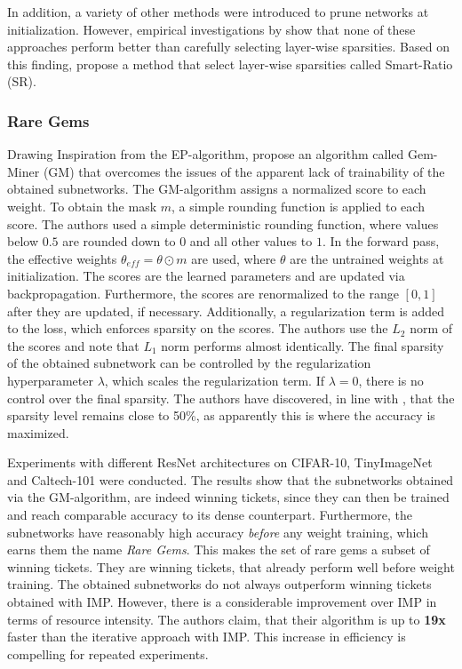 In addition, a variety of other methods \autocite{GraSP,SNIP,SynFlow} were introduced to prune networks at initialization. However, empirical investigations by \textcite{PruningAtInitMissingTheMark, SanityCheckingPruningMethods} show that none of these approaches perform better than carefully selecting layer-wise sparsities.
Based on this finding, \autocite{SanityCheckingPruningMethods} propose a method that select layer-wise sparsities called Smart-Ratio (SR).

\subsubsection{Rare Gems}
Drawing Inspiration from the EP-algorithm, \textcite{RareGems} propose an algorithm called Gem-Miner (GM) that overcomes the issues of the apparent lack of trainability of the obtained subnetworks.
The GM-algorithm assigns a normalized score to each weight. 
To obtain the mask $m$, a simple rounding function is applied to each score. The authors used a simple deterministic rounding function, where values below $0.5$ are rounded down to $0$ and all other values to $1$.
In the forward pass, the effective weights $\theta_{eff} = \theta \odot m$ are used, where $\theta$ are the untrained weights at initialization. 
The scores are the learned parameters and are updated via backpropagation.
Furthermore, the scores are renormalized to the range $[0,1]$ after they are updated, if necessary.
Additionally, a regularization term is added to the loss, which enforces sparsity on the scores. 
The authors use the $L_2$ norm of the scores and note that $L_1$ norm performs almost identically.
The final sparsity of the obtained subnetwork can be controlled by the regularization hyperparameter $\lambda$, which scales the regularization term.
 If $\lambda = 0$, there is no control over the final sparsity. 
 The authors have discovered, in line with \cite{DBLP:conf/cvpr/RamanujanWKFR20}, that the sparsity level remains close to 50\%, as apparently this is where the accuracy is maximized.

Experiments with different ResNet architectures on CIFAR-10, TinyImageNet \autocite{Tinyimagenet} and Caltech-101 \autocite{Caltech101} were conducted. 
The results show that the subnetworks obtained via the GM-algorithm, are indeed winning tickets, since they can then be trained and reach comparable accuracy to its dense counterpart.
Furthermore, the subnetworks have reasonably high accuracy \textit{before} any weight training, which earns them the name \textit{Rare Gems}. 
This makes the set of rare gems a subset of winning tickets. 
They are winning tickets, that already perform well before weight training.
The obtained subnetworks do not always outperform winning tickets obtained with IMP.
However, there is a considerable improvement over IMP in terms of resource intensity.
The authors claim, that their algorithm is up to \textbf{19x} faster than the iterative approach with IMP. 
This increase in efficiency is compelling for repeated experiments.

